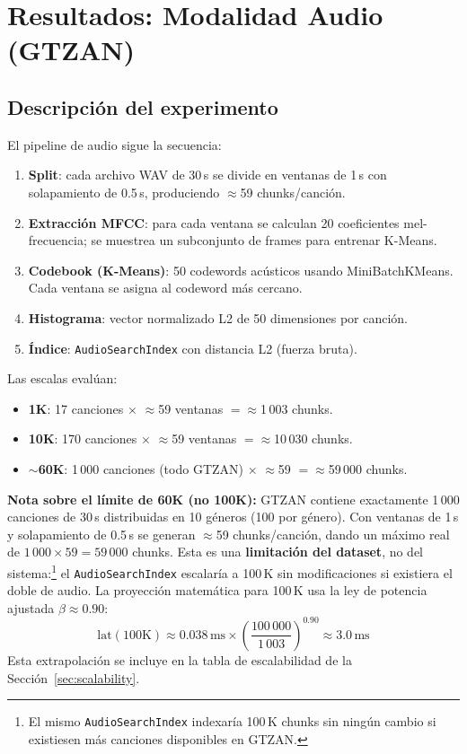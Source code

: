 \documentclass[12pt,a4paper]{article}
\newcommand{\system}[1]{\texttt{\small #1}}
\begin{document}
\section{Resultados: Modalidad Audio (GTZAN)}

\subsection{Descripción del experimento}

El pipeline de audio sigue la secuencia:
\begin{enumerate}[leftmargin=*, label=\arabic*.]
  \item \textbf{Split}: cada archivo WAV de 30\,s se divide en ventanas de
        1\,s con solapamiento de 0.5\,s, produciendo $\approx$59 chunks/canción.
  \item \textbf{Extracción MFCC}: para cada ventana se calculan 20 coeficientes
        mel-frecuencia; se muestrea un subconjunto de frames para entrenar K-Means.
  \item \textbf{Codebook (K-Means)}: 50 codewords acústicos usando
        MiniBatchKMeans. Cada ventana se asigna al codeword más cercano.
  \item \textbf{Histograma}: vector normalizado L2 de 50 dimensiones por canción.
  \item \textbf{Índice}: \system{AudioSearchIndex} con distancia L2 (fuerza bruta).
\end{enumerate}

Las escalas evalúan:
\begin{itemize}
  \item \textbf{1K}: 17 canciones $\times$ $\approx$59 ventanas $= \approx$1\,003 chunks.
  \item \textbf{10K}: 170 canciones $\times$ $\approx$59 ventanas $= \approx$10\,030 chunks.
  \item \textbf{$\sim$60K}: 1\,000 canciones (todo GTZAN) $\times$ $\approx$59 $= \approx$59\,000 chunks.
\end{itemize}

\noindent\textbf{Nota sobre el límite de 60K (no 100K):}
GTZAN contiene exactamente 1\,000 canciones de 30\,s distribuidas en 10 géneros
(100 por género). Con ventanas de 1\,s y solapamiento de 0.5\,s se generan
$\approx$59 chunks/canción, dando un máximo real de $1\,000 \times 59 = 59\,000$ chunks.
Esta es una \textbf{limitación del dataset}, no del sistema:\footnote{%
  El mismo \texttt{AudioSearchIndex} indexaría 100\,K chunks sin ningún
  cambio si existiesen más canciones disponibles en GTZAN.}
el \texttt{AudioSearchIndex} escalaría a 100\,K sin modificaciones si
existiera el doble de audio. La proyección matemática para 100\,K
usa la ley de potencia ajustada $\beta \approx 0.90$:
\[
  \text{lat}(100\text{K}) \approx 0.038\,\text{ms} \times
  \left(\frac{100\,000}{1\,003}\right)^{0.90} \approx 3.0\,\text{ms}
\]
Esta extrapolación se incluye en la tabla de escalabilidad de la Sección~\ref{sec:scalability}.
\end{document}
